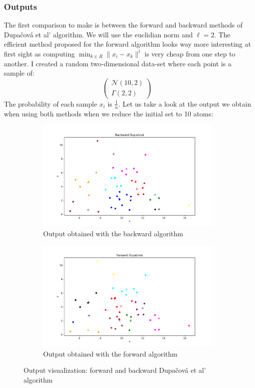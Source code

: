 \documentclass{amsart}
\begin{document}
\subsubsection{Outputs}
The first comparison to make is between the forward and backward methods of Dupačová et al' algorithm. We will use the euclidian norm and $\ell=2$. The efficient method proposed for the forward algorithm looks way more interesting at first sight as computing $\min_{k\in R}\lVert x_i-x_k\rVert^l$ is very cheap from one step to another. I created a random two-dimensional data-set where each point is a sample of: $$
\begin{pmatrix}
    \mathcal{N}\left(10,2\right) \\ \Gamma\left(2,2\right)
\end{pmatrix}
$$
The probability of each sample $x_i$ is $\frac{1}{n}$. Let us take a look at the output we obtain when using both methods when we reduce the initial set to 10 atoms: 
\begin{figure}[ht]
    \centering
    \begin{subfigure}[b]{0.45\textwidth}
        \centering
        \includegraphics[width=\textwidth]{plots/dupacova backward.pdf}
        \caption{Output obtained with the backward algorithm}
        \label{result back}
    \end{subfigure}
    \hfill
    \begin{subfigure}[b]{0.45\textwidth}
        \centering
        \includegraphics[width=\textwidth]{plots/dupacova forward.pdf}
        \caption{Output obtained with the forward algorithm}
        \label{result forw}
    \end{subfigure}
    \caption{Output visualization: forward and backward Dupačová et al' algorithm}
\end{figure}
\end{document}
